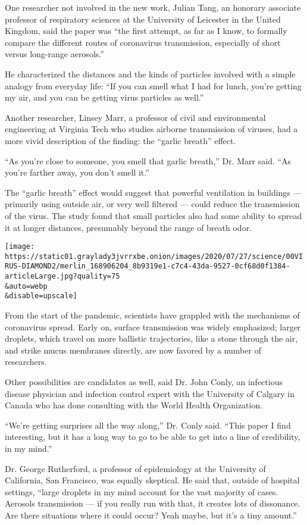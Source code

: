 One researcher not involved in the new work, Julian Tang, an honorary
associate professor of respiratory sciences at the University of
Leicester in the United Kingdom, said the paper was ``the first attempt,
as far as I know, to formally compare the different routes of
coronavirus transmission, especially of short versus long-range
aerosols.''

He characterized the distances and the kinds of particles involved with
a simple analogy from everyday life: ``If you can smell what I had for
lunch, you're getting my air, and you can be getting virus particles as
well.''

Another researcher, Linsey Marr, a professor of civil and environmental
engineering at Virginia Tech who studies airborne transmission of
viruses, had a more vivid description of the finding: the ``garlic
breath'' effect.

``As you're close to someone, you smell that garlic breath,'' Dr. Marr
said. ``As you're farther away, you don't smell it.''

The ``garlic breath'' effect would suggest that powerful ventilation in
buildings --- primarily using outside air, or very well filtered ---
could reduce the transmission of the virus. The study found that small
particles also had some ability to spread it at longer distances,
presumably beyond the range of breath odor.

\texttt{[image: https://static01.graylady3jvrrxbe.onion/images/2020/07/27/science/00VIRUS-DIAMOND2/merlin\_168906204\_8b9319e1-c7c4-43da-9527-0cf68d0f1384-articleLarge.jpg?quality=75\\\&auto=webp\\\&disable=upscale]}

From the start of the pandemic, scientists have grappled with the
mechanisms of coronavirus spread. Early on, surface transmission was
widely emphasized; larger droplets, which travel on more ballistic
trajectories, like a stone through the air, and strike mucus membranes
directly, are now favored by a number of researchers.

Other possibilities are candidates as well, said Dr. John Conly, an
infectious disease physician and infection control expert with the
University of Calgary in Canada who has done consulting with the World
Health Organization.

``We're getting surprises all the way along,'' Dr. Conly said. ``This
paper I find interesting, but it has a long way to go to be able to get
into a line of credibility, in my mind.''

Dr. George Rutherford, a professor of epidemiology at the University of
California, San Francisco, was equally skeptical. He said that, outside
of hospital settings, ``large droplets in my mind account for the vast
majority of cases. Aerosols transmission --- if you really run with
that, it creates lots of dissonance. Are there situations where it could
occur? Yeah maybe, but it's a tiny amount.''

